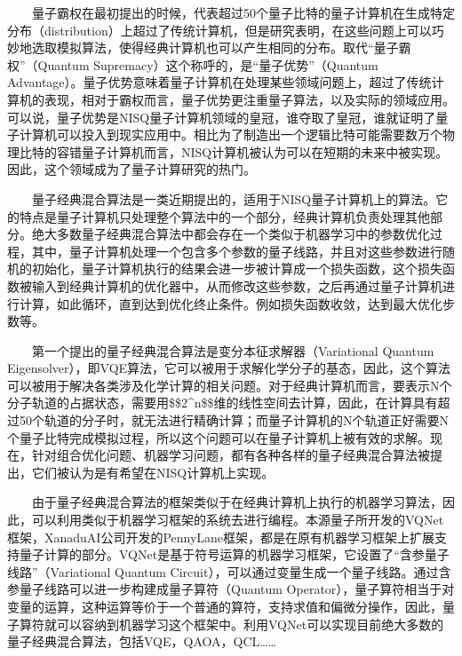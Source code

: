 \documentclass[a4paper,11pt,english]{sphinxmanual}
\begin{document}
\sphinxAtStartPar
  量子霸权在最初提出的时候，代表超过50个量子比特的量子计算机在生成特定分布（distribution）上超过了传统计算机，但是研究表明，在这些问题上可以巧妙地选取模拟算法，使得经典计算机也可以产生相同的分布。取代“量子霸权”（Quantum Supremacy）这个称呼的，是“量子优势”（Quantum Advantage）。量子优势意味着量子计算机在处理某些领域问题上，超过了传统计算机的表现，相对于霸权而言，量子优势更注重量子算法，以及实际的领域应用。可以说，量子优势是NISQ量子计算机领域的皇冠，谁夺取了皇冠，谁就证明了量子计算机可以投入到现实应用中。相比为了制造出一个逻辑比特可能需要数万个物理比特的容错量子计算机而言，NISQ计算机被认为可以在短期的未来中被实现。因此，这个领域成为了量子计算研究的热门。

\sphinxAtStartPar
  量子\sphinxhyphen{}经典混合算法是一类近期提出的，适用于NISQ量子计算机上的算法。它的特点是量子计算机只处理整个算法中的一个部分，经典计算机负责处理其他部分。绝大多数量子\sphinxhyphen{}经典混合算法中都会存在一个类似于机器学习中的参数优化过程，其中，量子计算机处理一个包含多个参数的量子线路，并且对这些参数进行随机的初始化，量子计算机执行的结果会进一步被计算成一个损失函数，这个损失函数被输入到经典计算机的优化器中，从而修改这些参数，之后再通过量子计算机进行计算，如此循环，直到达到优化终止条件。例如损失函数收敛，达到最大优化步数等。

\sphinxAtStartPar
  第一个提出的量子\sphinxhyphen{}经典混合算法是变分本征求解器（Variational Quantum Eigensolver），即VQE算法，它可以被用于求解化学分子的基态，因此，这个算法可以被用于解决各类涉及化学计算的相关问题。对于经典计算机而言，要表示N个分子轨道的占据状态，需要用\$\$2\textasciicircum{}n\$\$维的线性空间去计算，因此，在计算具有超过50个轨道的分子时，就无法进行精确计算；而量子计算机的N个轨道正好需要N个量子比特完成模拟过程，所以这个问题可以在量子计算机上被有效的求解。现在，针对组合优化问题、机器学习问题，都有各种各样的量子\sphinxhyphen{}经典混合算法被提出，它们被认为是有希望在NISQ计算机上实现。

\sphinxAtStartPar
  由于量子经典混合算法的框架类似于在经典计算机上执行的机器学习算法，因此，可以利用类似于机器学习框架的系统去进行编程。本源量子所开发的VQNet框架，XanaduAI公司开发的PennyLane框架，都是在原有机器学习框架上扩展支持量子计算的部分。VQNet是基于符号运算的机器学习框架，它设置了“含参量子线路”（Variational Quantum Circuit），可以通过变量生成一个量子线路。通过含参量子线路可以进一步构建成量子算符（Quantum Operator），量子算符相当于对变量的运算，这种运算等价于一个普通的算符，支持求值和偏微分操作，因此，量子算符就可以容纳到机器学习这个框架中。利用VQNet可以实现目前绝大多数的量子\sphinxhyphen{}经典混合算法，包括VQE，QAOA，QCL……
\end{document}
